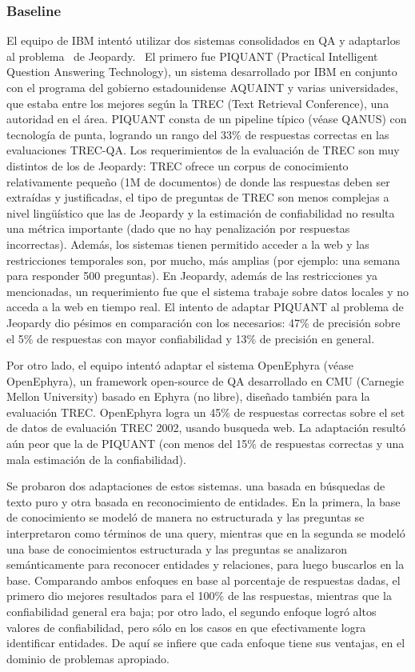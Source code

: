 \bigskip

\subsubsection*{Baseline}

El equipo de IBM intentó utilizar dos sistemas consolidados en QA y
adaptarlos al problema \ de Jeopardy. \ El primero fue PIQUANT
(Practical Intelligent Question Answering Technology), un sistema
desarrollado por IBM en conjunto con el programa del gobierno
estadounidense AQUAINT y varias universidades, que estaba entre los
mejores según la TREC (Text Retrieval Conference), una autoridad en
el área. PIQUANT consta de un pipeline típico (véase QANUS) con
tecnología de punta, logrando un rango del 33\% de respuestas
correctas en las evaluaciones TREC-QA. Los requerimientos de la
evaluación de TREC son muy distintos de los de Jeopardy: TREC ofrece
un corpus de conocimiento relativamente pequeño (1M de documentos) de
donde las respuestas deben ser extraídas y justificadas, el tipo de
preguntas de TREC son menos complejas a nivel ling\"uístico que las
de Jeopardy y la estimación de confiabilidad no resulta una métrica
importante (dado que no hay penalización por respuestas incorrectas).
Además, los sistemas tienen permitido acceder a la web y las
restricciones temporales son, por mucho, más amplias (por ejemplo:
una semana para responder 500 preguntas). En Jeopardy, además de las
restricciones ya mencionadas, un requerimiento fue que el sistema
trabaje sobre datos locales y no acceda a la web en tiempo real. El
intento de adaptar PIQUANT al problema de Jeopardy dio pésimos en
comparación con los necesarios: 47\% de precisión sobre el 5\% de
respuestas con mayor confiabilidad y 13\% de precisión en general. 

Por otro lado, el equipo intentó adaptar el sistema OpenEphyra
(véase OpenEphyra), un framework open-source de QA desarrollado en
CMU (Carnegie Mellon University) basado en Ephyra (no libre),
diseñado también para la evaluación TREC. OpenEphyra logra un
45\% de respuestas correctas sobre el set de datos de evaluación TREC
2002, usando busqueda web. La adaptación resultó aún peor que la
de PIQUANT (con menos del 15\% de respuestas correctas y una mala
estimación de la confiabilidad). 

Se probaron dos adaptaciones de estos sistemas. una basada en
búsquedas de texto puro y otra basada en reconocimiento de entidades.
En la primera, la base de conocimiento se modeló de manera no
estructurada y las preguntas se interpretaron como términos de una
query, mientras que en la segunda se modeló una base de conocimientos
estructurada y las preguntas se analizaron semánticamente para
reconocer entidades y relaciones, para luego buscarlos en la base.
Comparando ambos enfoques en base al porcentaje de respuestas dadas, el
primero dio mejores resultados para el 100\% de las respuestas,
mientras que la confiabilidad general era baja; por otro lado, el
segundo enfoque logró altos valores de confiabilidad, pero sólo en
los casos en que efectivamente logra identificar entidades. De aquí
se infiere que cada enfoque tiene sus ventajas, en el dominio de
problemas apropiado.

